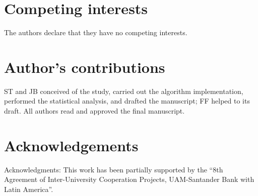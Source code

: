 \documentclass{bmcart}
\begin{document}
\begin{backmatter}

\section*{Competing interests}
  The authors declare that they have no competing interests.

\section*{Author's contributions}
    ST and JB conceived of the study, carried out the algorithm implementation, performed the statistical analysis, and drafted the manuscript; FF helped to its draft. All authors read and approved the final manuscript.

\section*{Acknowledgements}
  Acknowledgments: This work has been partially supported by the “8th Agreement of Inter-University Cooperation Projects, UAM-Santander Bank with Latin America”.  




\end{backmatter}
\end{document}
